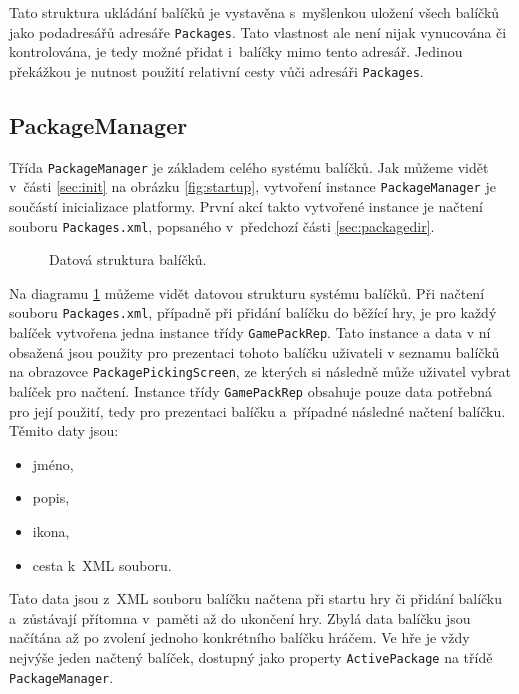 Tato struktura ukládání balíčků je vystavěna s~myšlenkou uložení všech balíčků jako podadresářů adresáře \texttt{Packages}. Tato vlastnost ale není nijak vynucována či kontrolována, je tedy možné přidat i~balíčky mimo tento adresář. Jedinou překážkou je nutnost použití relativní cesty vůči adresáři \texttt{Packages}.

\subsection{PackageManager}
\label{sec:packagemanager}
Třída \texttt{PackageManager} je základem celého systému balíčků. Jak můžeme vidět v~části \ref{sec:init} na obrázku \ref{fig:startup}, vytvoření instance \texttt{PackageManager} je součástí inicializace platformy. První akcí takto vytvořené instance je načtení souboru \texttt{Packages.xml}, popsaného v~předchozí části \ref{sec:packagedir}.

\begin{figure}[h]
	\centering
	\fontsize{8pt}{11pt}\selectfont
	\def\svgwidth{\textwidth}
	
	\caption{Datová struktura balíčků.}
	\label{fig:packagemanager}
\end{figure}

Na diagramu \ref{fig:packagemanager} můžeme vidět datovou strukturu systému balíčků. Při načtení souboru \texttt{Packages.xml}, případně při přidání balíčku do běžící hry, je pro každý balíček vytvořena jedna instance třídy \texttt{GamePackRep}. Tato instance a data v ní obsažená jsou použity pro prezentaci tohoto balíčku uživateli v seznamu balíčků na obrazovce \texttt{PackagePickingScreen}, ze kterých si následně může uživatel vybrat balíček pro načtení. Instance třídy \texttt{GamePackRep} obsahuje pouze data potřebná pro její použití, tedy pro prezentaci balíčku a~případné následné načtení balíčku. Těmito daty jsou:

\begin{itemize}
	\item jméno,
	\item popis,
	\item ikona,
	\item cesta k~XML souboru.
\end{itemize}

Tato data jsou z~XML souboru balíčku načtena při startu hry či přidání balíčku a~zůstávají přítomna v~paměti až do ukončení hry. Zbylá data balíčku jsou načítána až po zvolení jednoho konkrétního balíčku hráčem. Ve hře je vždy nejvýše jeden načtený balíček, dostupný jako property \texttt{ActivePackage} na třídě \texttt{PackageManager}.

